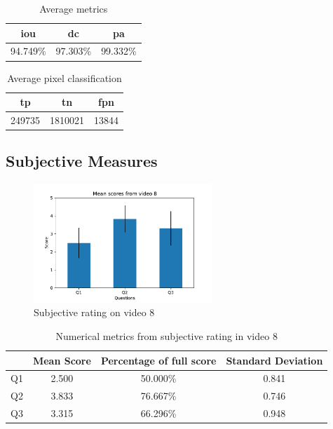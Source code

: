 \begin{minipage}[c]{0.475\textwidth}
\begin{table}[H]
    \centering
    \begin{tabular}{||c c c||} 
        \hline
        \acrshort{iou} & \acrshort{dc} & \acrshort{pa} \\ [0.5ex] 
        \hline\hline
        94.749\% & 97.303\% & 99.332\% \\ [1ex] 
        \hline
    \end{tabular}
    \caption{Average metrics}
    \label{tab:metrics_video_8}
\end{table}
\end{minipage}
\begin{minipage}[c]{0.475\textwidth}
\begin{table}[H]
    \centering
    \begin{tabular}{||c c c||} 
        \hline
        \acrshort{tp} & \acrshort{tn} & \acrshort{fpn} \\ [0.5ex] 
        \hline\hline
        249735 & 1810021 & 13844 \\ [1ex] 
        \hline
    \end{tabular}
    \caption{Average pixel classification}
    \label{tab:pixels_video_8}
\end{table}
\end{minipage}

\subsection{Subjective Measures}

\begin{figure}[H]
    \centering
    \includegraphics[width=0.6\textwidth]{img/subjective_measures/analysis/video_8.pdf}
    \caption{Subjective rating on video 8}
    \label{fig:visual_subj_vid8}
\end{figure}

\begin{table}[H]
    \centering
    \begin{tabular}{|c|c c c|} 
        \hline
           & \textbf{Mean Score} & \textbf{Percentage of full score} & \textbf{Standard Deviation} \\ [0.5ex] 
        \hline
        Q1 & 2.500 & 50.000\% & 0.841 \\ [1ex] 
        Q2 & 3.833 & 76.667\% & 0.746 \\ [1ex] 
        Q3 & 3.315 & 66.296\% & 0.948 \\ [1ex] 
        \hline
    \end{tabular}
    \caption{Numerical metrics from subjective rating in video 8}
    \label{tab:numerical_subj_vid8}
\end{table}

